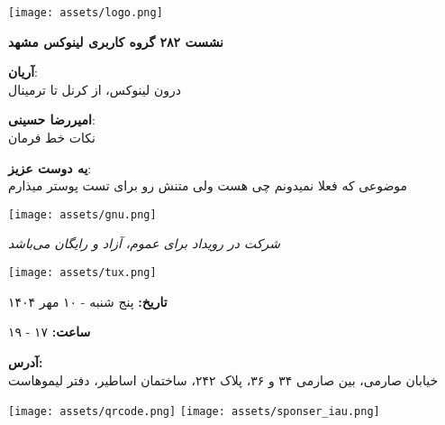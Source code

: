 \documentclass[a4paper]{article}
\begin{document}
\begin{minipage}{0.2\textwidth}
  \texttt{[image: assets/logo.png]}
\end{minipage}
\hfill
\begin{minipage}{0.8\textwidth}
  \raggedleft
  {\Huge\textbf{نشست ۲۸۲ گروه کاربری لینوکس مشهد}}\\
\end{minipage}

\vspace{1cm}


\begin{minipage}[t]{0.5\textwidth}
	\huge
	\raggedleft

	\textbf{آریان}:\\
	درون لینوکس، از کرنل تا ترمینال
	\vspace{0.3cm}

	\textbf{امیررضا حسینی}:\\
	نکات خط فرمان
	\vspace{0.3cm}

	\textbf{یه دوست عزیز}:\\
	موضوعی که فعلا نمیدونم چی هست ولی متنش رو برای تست پوستر میذارم
\end{minipage}
\hfill
\begin{minipage}[t]{0.5\textwidth}
\centering
\vspace{\fill}
\texttt{[image: assets/gnu.png]}
\vspace{\fill}
\end{minipage}

\vspace{1.5cm}

\begin{minipage}{\textwidth}
\centering
\Huge
\textit{شرکت در رویداد برای عموم، آزاد و رایگان می‌باشد}
\end{minipage}

\vspace{1.5cm}

\begin{minipage}[t]{0.47\textwidth}
\centering
\vspace{\fill}
\texttt{[image: assets/tux.png]}
\vspace{\fill}
\end{minipage}
\hfill
\begin{minipage}[t]{0.5\textwidth}
	\huge
	\raggedleft

	\textbf{تاریخ:} پنج شنبه - ۱۰ مهر ۱۴۰۴
	\vspace{0.3cm}

	\textbf{ساعت:} ۱۷ - ۱۹
	\vspace{0.3cm}

	\textbf{آدرس:}\\
	خیابان صارمی، بین صارمی ۳۴ و ۳۶، پلاک ۲۴۲، ساختمان اساطیر، دفتر لیموهاست
	\vspace{0.3cm}

	\texttt{[image: assets/qrcode.png]}
	\vspace{\fill}
	\texttt{[image: assets/sponser\_iau.png]}
\end{minipage}
\end{document}
